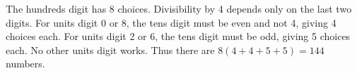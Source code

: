 The hundreds digit has 8 choices. Divisibility by 4 depends only on the last two digits. For units digit 0 or 8, the tens digit must be even and not 4, giving 4 choices each. For units digit 2 or 6, the tens digit must be odd, giving 5 choices each. No other units digit works. Thus there are $ 8(4+4+5+5)=\boxed{144}$ numbers.
